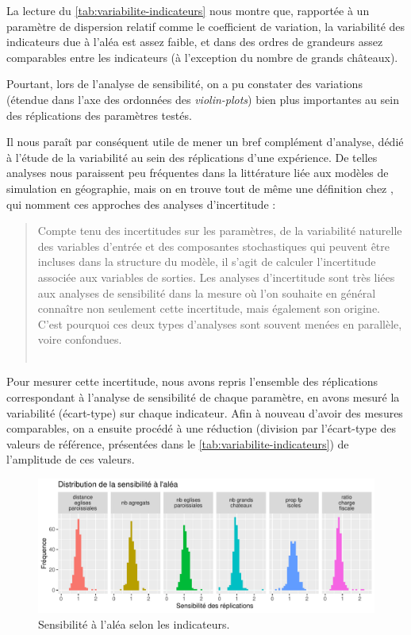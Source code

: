 La lecture du \cref{tab:variabilite-indicateurs} nous montre que, rapportée à un paramètre de dispersion relatif comme le coefficient de variation, la variabilité des indicateurs due à l'aléa est assez faible, et dans des ordres de grandeurs assez comparables entre les indicateurs (à l'exception du nombre de grands châteaux).

Pourtant, lors de l'analyse de sensibilité, on a pu constater des variations (étendue dans l'axe des ordonnées des \textit{violin-plots}) bien plus importantes au sein des réplications des paramètres testés.

Il nous paraît par conséquent utile de mener un bref complément d'analyse, dédié à l'étude de la variabilité au sein des réplications d'une expérience.
De telles analyses nous paraissent peu fréquentes dans la littérature liée aux modèles de simulation en géographie, mais on en trouve tout de même une définition chez \textcite{ginot2005explorer}, qui nomment ces approches des \og analyses d'incertitude\fg{} : 
\begin{quotation}
	\og Compte tenu des incertitudes sur les paramètres, de la variabilité naturelle des variables d'entrée et des composantes stochastiques qui peuvent être incluses dans la structure du modèle, il s'agit de calculer l'incertitude associée aux variables de sorties.
	Les analyses d'incertitude sont très liées aux analyses de sensibilité dans la mesure où l'on souhaite en général connaître non seulement cette incertitude, mais également son origine.
	C'est pourquoi ces deux types d'analyses sont souvent menées en parallèle, voire confondues.\fg{}\\
	\mbox{}~ \hfill \cite[76]{ginot2005explorer}
\end{quotation}

Pour mesurer cette incertitude, nous avons repris l'ensemble des réplications correspondant à l'analyse de sensibilité de chaque paramètre, en avons mesuré la variabilité (écart-type) sur chaque indicateur.
Afin à nouveau d'avoir des mesures comparables, on a ensuite procédé à une réduction (division par l'écart-type des valeurs de référence, présentées dans le \cref{tab:variabilite-indicateurs}) de l'amplitude de ces valeurs.

\begin{figure}[H]
	\centering
	\includegraphics[width=\linewidth]{img/histo_sensibilite_alea.pdf}
	\caption{Sensibilité à l'aléa selon les indicateurs.}
	\label{fig:histo-sensib-alea}
\end{figure}

